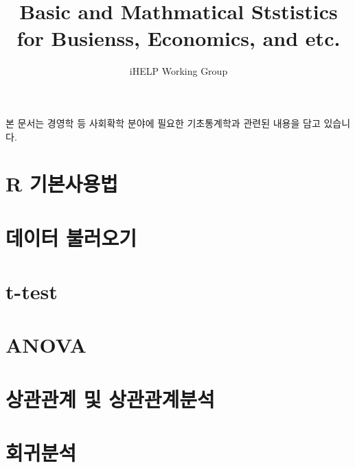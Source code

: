 \documentclass{article}
\begin{document}
\title{Basic and Mathmatical Ststistics for Busienss, Economics, and etc.}
\author{iHELP Working Group}

본 문서는 경영학 등 사회확학 분야에 필요한 기초통계학과 관련된 내용을 담고 있습니다.

\chapter{R 기본사용법}


\chapter{데이터 불러오기}


\chapter{t-test}


\chapter{ANOVA}


\chapter{상관관계 및 상관관계분석}


\chapter{회귀분석}

\end{document}
